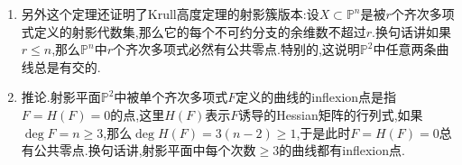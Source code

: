 \begin{enumerate}
\begin{proof}
		设$E\subset\mathbb{P}^N$是维数$s$的线性子空间.假设$s\ge N-n$,那么$E$可以被$\le n$个线性方程定义,反复使用$\dim X_F=\dim X-1$得到$\dim X\cap E\ge0$,导致$X\cap E$非空.于是$s\le N-n-1$.接下来可以选取1次齐次多项式组$\{L_0,L_1,\cdots,L_n\}$使得它们在$X$上没有公共零点,此时$E$的维数是$N-n-1$,并且$X\cap E$是空集.
	\end{proof}
	\item 另外这个定理还证明了Krull高度定理的射影簇版本:设$X\subset\mathbb{P}^n$是被$r$个齐次多项式定义的射影代数集,那么它的每个不可约分支的余维数不超过$r$.换句话讲如果$r\le n$,那么$\mathbb{P}^n$中$r$个齐次多项式必然有公共零点.特别的,这说明$\mathbb{P}^2$中任意两条曲线总是有交的.
	\item 推论.射影平面$\mathbb{P}^2$中被单个齐次多项式$F$定义的曲线的inflexion点是指$F=H(F)=0$的点,这里$H(F)$表示$F$诱导的Hessian矩阵的行列式,如果$\deg F=n\ge3$,那么$\deg H(F)=3(n-2)\ge1$,于是此时$F=H(F)=0$总有公共零点.换句话讲,射影平面中每个次数$\ge3$的曲线都有inflexion点.
\end{enumerate}

